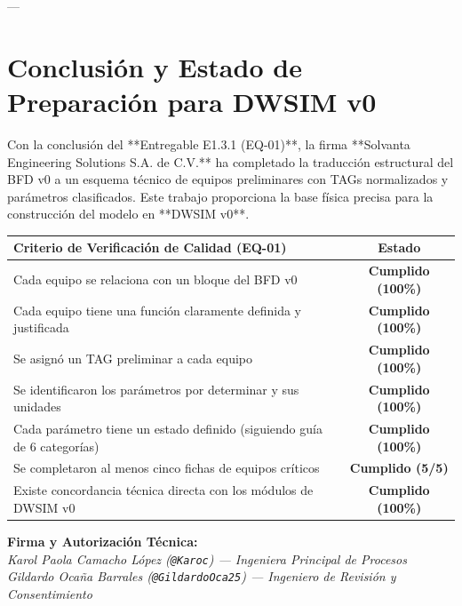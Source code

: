 \documentclass[11pt,letterpaper]{article}
\begin{document}
---

\section{Conclusión y Estado de Preparación para DWSIM v0}

Con la conclusión del **Entregable E1.3.1 (EQ-01)**, la firma **Solvanta Engineering Solutions S.A. de C.V.** ha completado la traducción estructural del BFD v0 a un esquema técnico de equipos preliminares con TAGs normalizados y parámetros clasificados. Este trabajo proporciona la base física precisa para la construcción del modelo en **DWSIM v0**.

\begin{table}[h!]
    \centering
    \small
    \begin{tabularx}{0.9\textwidth}{|X|c|}
        \hline
        \rowcolor{SolvantaNavy}
        \textbf{\color{white}Criterio de Verificación de Calidad (EQ-01)} & \textbf{\color{white}Estado} \\
        \hline
        Cada equipo se relaciona con un bloque del BFD v0 & \textbf{Cumplido (100\%)} \\
        Cada equipo tiene una función claramente definida y justificada & \textbf{Cumplido (100\%)} \\
        Se asignó un TAG preliminar a cada equipo & \textbf{Cumplido (100\%)} \\
        Se identificaron los parámetros por determinar y sus unidades & \textbf{Cumplido (100\%)} \\
        Cada parámetro tiene un estado definido (siguiendo guía de 6 categorías) & \textbf{Cumplido (100\%)} \\
        Se completaron al menos cinco fichas de equipos críticos & \textbf{Cumplido (5/5)} \\
        Existe concordancia técnica directa con los módulos de DWSIM v0 & \textbf{Cumplido (100\%)} \\
        \hline
    \end{tabularx}
\end{table}

\vspace{0.5cm}

\begin{tcolorbox}[colback=SolvantaNavy,colframe=SolvantaNavy]
    \color{white}
    \centering
    \textbf{Firma y Autorización Técnica:}\\
    \vspace{0.2cm}
    \textit{Karol Paola Camacho López (\texttt{@Karoc}) — Ingeniera Principal de Procesos}\\
    \textit{Gildardo Ocaña Barrales (\texttt{@GildardoOca25}) — Ingeniero de Revisión y Consentimiento}
\end{tcolorbox}
\end{document}
